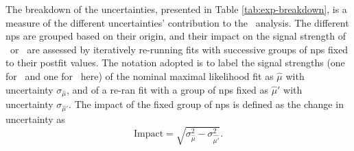 The breakdown of the uncertainties, presented in Table \ref{tab:exp-breakdown}, is a measure of the different uncertainties' contribution to the \vhbc\ analysis. The different \gls{np}s are grouped based on their origin, and their impact on the signal strength of \vhb\ or \vhc\ are assessed by iteratively re-running fits with successive groups of \gls{np}s fixed to their postfit values. The notation adopted is to label the signal strengths (one for \vhb\ and one for \vhc\ here) of the nominal maximal likelihood fit as $\hat{\mu}$ with uncertainty $\sigma_{\hat{\mu}}$, and of a re-ran fit with a group of \gls{np}s fixed as $\hat{\mu}'$ with uncertainty $\sigma_{\hat{\mu}'}$. The impact of the fixed group of \gls{np}s is defined as the change in uncertainty as 
\begin{equation}
    \text{Impact} = \sqrt{\sigma^2_{\hat{\mu}} - \sigma^2_{\hat{\mu'}}}.
\end{equation}

